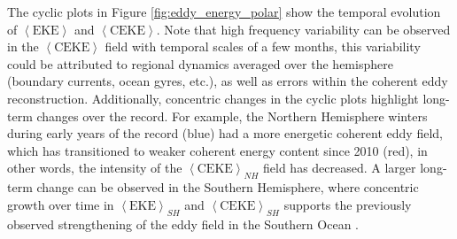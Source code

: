 \documentclass[draft,linenumbers]{agujournal2019}
\newcommand{\EKE}{\textrm{EKE}}
\newcommand{\CEKE}{\textrm{CEKE}}
\begin{document}
	The cyclic plots in Figure \ref{fig:eddy_energy_polar} show the temporal evolution of $\left<\EKE\right>$ and $\left<\CEKE\right>$. 
	Note that high frequency variability can be observed in the $\left<\CEKE\right>$ field with temporal scales of a few months, this variability could be attributed to regional dynamics averaged over the hemisphere (boundary currents, ocean gyres, etc.), as well as errors within the coherent eddy reconstruction. 
	Additionally, concentric changes in the cyclic plots highlight long-term changes over the record. For example, the Northern Hemisphere winters during early years of the record (blue) had a more energetic coherent eddy field, which has transitioned to weaker coherent energy content since 2010 (red), in other words, the intensity of the $\left<\CEKE\right>_{NH}$ field has decreased. A larger long-term change can be observed in the Southern Hemisphere, where concentric growth over time in $\left<\EKE\right>_{SH}$ and $\left<\CEKE\right>_{SH}$ supports the previously observed strengthening of the eddy field in the Southern Ocean \citep{Hogg_Recent_2015,Martinez_TKE_2019,Martinez_Kinetic_2021}. 
\end{document}
